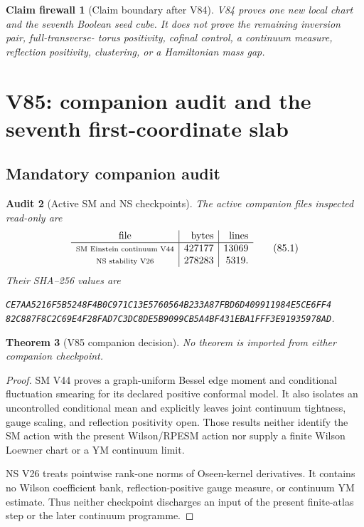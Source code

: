 \documentclass[11pt,oneside]{article}
\newtheorem{theorem}{Theorem}[section]
\newtheorem{firewall}[theorem]{Claim firewall}
\newtheorem{audit}[theorem]{Audit}
\theoremstyle{definition}
\theoremstyle{remark}
\begin{document}
\begin{firewall}[Claim boundary after V84]
\label{fire:newv84-final}
V84 proves one new local chart and the seventh Boolean seed cube.
It does not prove the remaining inversion pair, full-transverse-
torus positivity, cofinal control, a continuum measure, reflection
positivity, clustering, or a Hamiltonian mass gap.
\end{firewall}

\section{V85: companion audit and the seventh first-coordinate slab}
\label{sec:newv85-seventh-first-slab}

\subsection{Mandatory companion audit}

\begin{audit}[Active SM and NS checkpoints]
\label{audit:newv85-companions}
The active companion files inspected read-only are
\[
\begin{array}{c|r|r}
\text{file}&\text{bytes}&\text{lines}\\ \hline
\text{\scriptsize SM Einstein continuum V44}&427177&13069\\
\text{\scriptsize NS stability V26}&278283&5319.
\end{array}                                             \tag{85.1}
\]
Their SHA--256 values are
\begin{center}\scriptsize
\texttt{CE7AA5216F5B5248F4B0C971C13E5760564B233A87FBD6D409911984E5CE6FF4}\\
\texttt{82C887F8C2C69E4F28FAD7C3DC8DE5B9099CB5A4BF431EBA1FFF3E91935978AD}.
\end{center}
\end{audit}

\begin{theorem}[V85 companion decision]
\label{thm:newv85-audit-decision}
No theorem is imported from either companion checkpoint.
\end{theorem}

\begin{proof}
SM V44 proves a graph-uniform Bessel edge moment and conditional
fluctuation smearing for its declared positive conformal model.  It
also isolates an uncontrolled conditional mean and explicitly leaves
joint continuum tightness, gauge scaling, and reflection positivity
open.  Those results neither identify the SM action with the present
Wilson/RPESM action nor supply a finite Wilson Loewner chart or a YM
continuum limit.

NS V26 treats pointwise rank-one norms of Oseen-kernel derivatives.
It contains no Wilson coefficient bank, reflection-positive gauge
measure, or continuum YM estimate.  Thus neither checkpoint discharges
an input of the present finite-atlas step or the later continuum
programme.
\end{proof}
\end{document}
